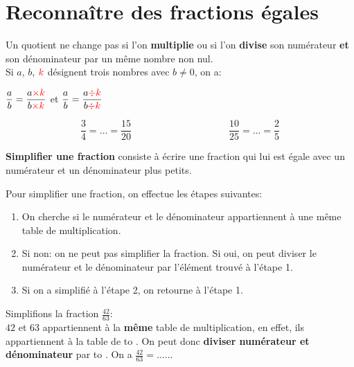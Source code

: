 \documentclass[12pt]{article}
\newif\iftrou\troutrue
\newlength{\trouwidth}
\newcommand{\trou}[1]{%
	\iftrou%
	\settowidth{\trouwidth}{#1}%
	\hbox to \trouwidth{\dotfill}%
	\else%
	#1%
	\fi}
\begin{document}
\section{Reconnaître des fractions égales}

\begin{prop}{}{}
	Un quotient ne change pas si l'on \textbf{multiplie} ou si l'on \textbf{divise} son numérateur \textbf{et} son dénominateur par un même nombre non nul.\\
	Si $a$, $b$, $\textcolor{red}{k}$ désignent trois nombres avec $b \ne 0$, on a:
	\begin{center}
		$\displaystyle\frac{a}{b} = \displaystyle\frac{a \textcolor{red}{ \times k} }{b \textcolor{red}{ \times k}}$ et $ \displaystyle\frac{a}{b} = \displaystyle\frac{a \textcolor{red}{ \div k}}{b \textcolor{red}{ \div k}}$ 
	\end{center}
\end{prop}


\begin{ex}{}{}
	$$\displaystyle\frac{3}{4} = 
	\dots
	= \displaystyle\frac{15}{20}	\qquad \qquad \qquad \qquad \qquad  \displaystyle\frac{10}{25} =
	\dots = \displaystyle\frac{2}{5}$$
\end{ex}

\begin{defin}{}{}
	\textbf{Simplifier une fraction} consiste à écrire une fraction qui lui est égale avec un numérateur et un dénominateur plus petits.
\end{defin}

\begin{prop}{}{}
	Pour simplifier une fraction, on effectue les étapes suivantes:
	\begin{enumerate}
		\item On cherche si le numérateur et le dénominateur appartiennent à une même table de multiplication.
		\item Si non: on ne peut pas simplifier la fraction. Si oui, on peut diviser le numérateur et le dénominateur par l'élément trouvé à l'étape 1.
		\item Si on a simplifié à l'étape 2, on retourne à l'étape 1.
	\end{enumerate}
\end{prop}


\begin{ex}{}{}
	Simplifions la fraction $\displaystyle\frac{42}{63}$:\\
	$42$ et $63$ appartiennent à la \textbf{même} table de multiplication, en effet, ils appartiennent à la table de \trou{$7$}. On peut donc \textbf{diviser numérateur et dénominateur} par \trou{$7$}. On a $\displaystyle\frac{42}{63}=\dots\dots$
\end{ex}
\end{document}
